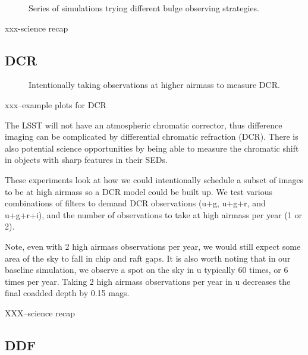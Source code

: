 \begin{figure}
\caption{Series of simulations trying different bulge observing strategies.}\label{fig:bulge}
\end{figure}


xxx-science recap


\subsection{DCR}

\begin{figure}
\caption{Intentionally taking observations at higher airmass to measure DCR.}
\end{figure}

xxx--example plots for DCR

The LSST will not have an atmospheric chromatic corrector, thus difference imaging can be complicated by differential chromatic refraction (DCR). There is also potential science opportunities by being able to measure the chromatic shift in objects with sharp features in their SEDs.

These experiments look at how we could intentionally schedule a subset of images to be at high airmass so a DCR model could be built up. We test various combinations of filters to demand DCR observations (u+g, u+g+r, and u+g+r+i), and the number of observations to take at high airmass per year (1 or 2). 

Note, even with 2 high airmass observations per year, we would still expect some area of the sky to fall in chip and raft gaps.  It is also worth noting that in our baseline simulation, we observe a spot on the sky in u typically 60 times, or 6 times per year. Taking 2 high airmass observations per year in u decreases the final coadded depth by 0.15 mags.

XXX--science recap

   
\subsection{DDF}

